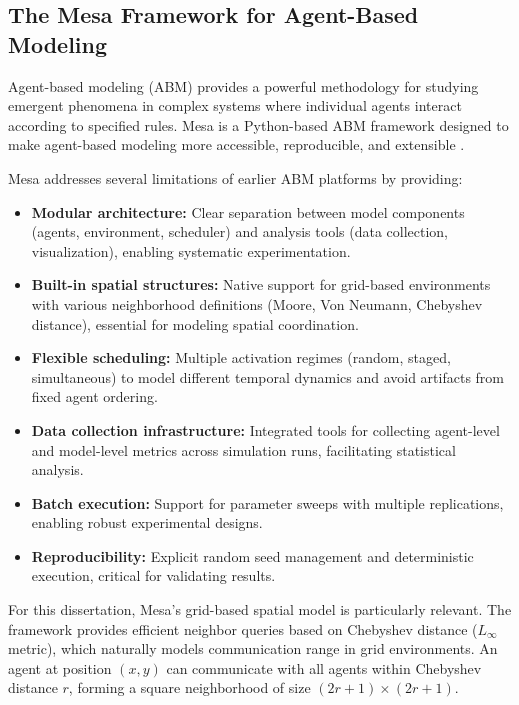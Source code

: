 \subsection{The Mesa Framework for Agent-Based Modeling}

Agent-based modeling (ABM) provides a powerful methodology for studying emergent phenomena in complex systems where individual agents interact according to specified rules. Mesa is a Python-based ABM framework designed to make agent-based modeling more accessible, reproducible, and extensible \citep{kazil2020}.

Mesa addresses several limitations of earlier ABM platforms by providing:

\begin{itemize}
    \item \textbf{Modular architecture:} Clear separation between model components (agents, environment, scheduler) and analysis tools (data collection, visualization), enabling systematic experimentation.

    \item \textbf{Built-in spatial structures:} Native support for grid-based environments with various neighborhood definitions (Moore, Von Neumann, Chebyshev distance), essential for modeling spatial coordination.

    \item \textbf{Flexible scheduling:} Multiple activation regimes (random, staged, simultaneous) to model different temporal dynamics and avoid artifacts from fixed agent ordering.

    \item \textbf{Data collection infrastructure:} Integrated tools for collecting agent-level and model-level metrics across simulation runs, facilitating statistical analysis.

    \item \textbf{Batch execution:} Support for parameter sweeps with multiple replications, enabling robust experimental designs.

    \item \textbf{Reproducibility:} Explicit random seed management and deterministic execution, critical for validating results.
\end{itemize}

For this dissertation, Mesa's grid-based spatial model is particularly relevant. The framework provides efficient neighbor queries based on Chebyshev distance ($L_\infty$ metric), which naturally models communication range in grid environments. An agent at position $(x, y)$ can communicate with all agents within Chebyshev distance $r$, forming a square neighborhood of size $(2r+1) \times (2r+1)$.

